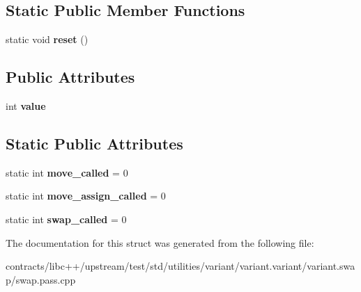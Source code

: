\subsection*{Static Public Member Functions}
\begin{DoxyCompactItemize}
\item 
\mbox{\label{struct_nothrow_type_imp_a4e472f068920d77db4814e8cfeaf7c72}} 
static void {\bfseries reset} ()
\end{DoxyCompactItemize}
\subsection*{Public Attributes}
\begin{DoxyCompactItemize}
\item 
\mbox{\label{struct_nothrow_type_imp_aff78884fb87c2c2691b6a8e9e0b6f38a}} 
int {\bfseries value}
\end{DoxyCompactItemize}
\subsection*{Static Public Attributes}
\begin{DoxyCompactItemize}
\item 
\mbox{\label{struct_nothrow_type_imp_ac140f1cb8c23fb09037a4c2a596edecc}} 
static int {\bfseries move\+\_\+called} = 0
\item 
\mbox{\label{struct_nothrow_type_imp_a6ccc33845a3cda2cefe13de3eb3b8c7a}} 
static int {\bfseries move\+\_\+assign\+\_\+called} = 0
\item 
\mbox{\label{struct_nothrow_type_imp_ae7669a4a5f2ec478a59cf06b50e5dfcc}} 
static int {\bfseries swap\+\_\+called} = 0
\end{DoxyCompactItemize}


The documentation for this struct was generated from the following file\+:\begin{DoxyCompactItemize}
\item 
contracts/libc++/upstream/test/std/utilities/variant/variant.\+variant/variant.\+swap/swap.\+pass.\+cpp\end{DoxyCompactItemize}
